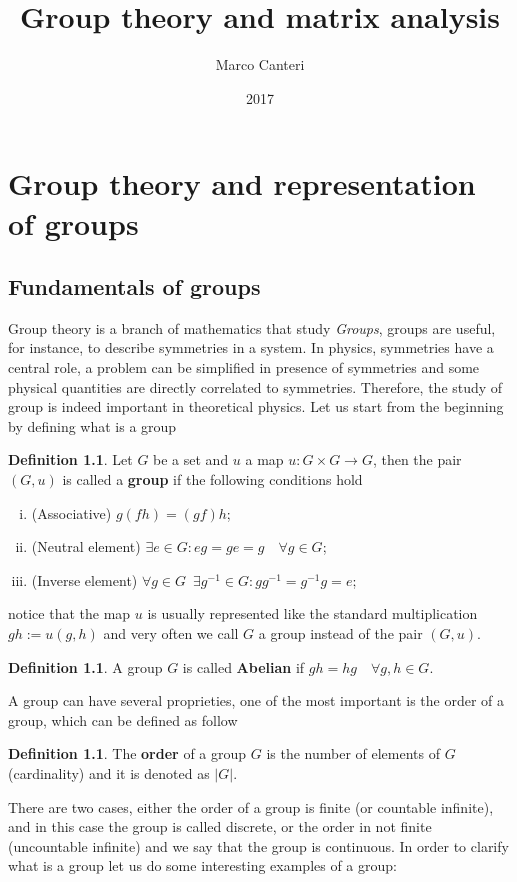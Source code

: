 \documentclass[12pt]{book}
\title{\textbf{Group theory and matrix analysis}}
\author{Marco Canteri}
\date{2017}
\theoremstyle{plain}
\theoremstyle{definition}
\newtheorem{dfn}[thm]{Definition}
\theoremstyle{remark}
\begin{document}
\maketitle
\tableofcontents
\chapter{Group theory and representation of groups}
\section{Fundamentals of groups}
Group theory is a branch of mathematics that study \emph{Groups}, groups are useful, for instance, to describe symmetries in a system. In physics, symmetries have a central role, a problem can be simplified in presence of symmetries and some physical quantities are directly correlated to symmetries. Therefore, the study of group is indeed important in theoretical physics.
Let us start from the beginning by defining what is a group
\begin{dfn}
Let $G$ be a set and $u$ a map $u:G\times G\to G$, then the pair $(G,u)$ is called a \textbf{group} if the following conditions hold
\begin{enumerate}[i.]
\item (Associative) $g(fh) = (gf)h$;
\item (Neutral element) $\exists e\in G: eg=ge=g\quad\forall g\in G$;
\item (Inverse element) $\forall g\in G\,$ $\exists g^{-1}\in G: gg^{-1} = g^{-1}g=e$;
\end{enumerate}
notice that the map $u$ is usually represented like the standard multiplication $gh:=u(g,h)$ and very often we call $G$ a group instead of the pair $(G,u)$.
\end{dfn}
\begin{dfn}
A group $G$ is called \textbf{Abelian} if $gh=hg\quad \forall g,h\in G$.
\end{dfn}
A group can have several proprieties, one of the most important is the order of a group, which can be defined as follow
\begin{dfn}
The \textbf{order} of a group $G$ is the number of elements of $G$ (cardinality) and it is denoted as $|G|$. 
\end{dfn}
There are two cases, either the order of a group is finite (or countable infinite), and in this case the group is called discrete, or the order in not finite (uncountable infinite) and we say that the group is continuous. In order to clarify what is a group let us do some interesting examples of a group:
\end{document}
